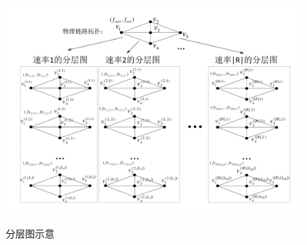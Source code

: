 \begin{figure}
\setlength{\belowcaptionskip}{-0.5cm}
  \begin{center}
    {\includegraphics[width=1 \textwidth]{figures/LAYER.pdf}}
    \end{center}
  \caption{{\footnotesize{分层图示意}}}
  \label{layer}
\end{figure}
